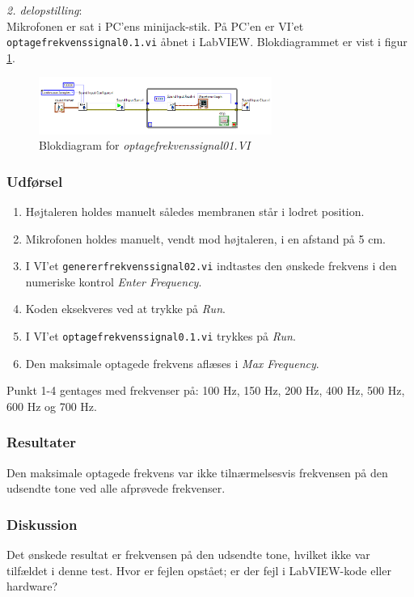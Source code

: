 		\textit{2. delopstilling}:\\
		Mikrofonen er sat i PC'ens minijack-stik. På PC'en er VI'et \texttt{optagefrekvenssignal0.1.vi} åbnet i LabVIEW. Blokdiagrammet er vist i figur \ref{fig:1of01}.\\
		
		\begin{figure}[htb]
			\centering
				\includegraphics[width=3in]{of01}
				\caption{Blokdiagram for \textit{optagefrekvenssignal01.VI}}	
				\label{fig:1of01}
			\end{figure}
		
		\subsubsection{Udførsel}
			\begin{enumerate}
				\item Højtaleren holdes manuelt således membranen står i lodret position. 
				\item Mikrofonen holdes manuelt, vendt mod højtaleren, i en afstand på 5 cm. 
				\item I VI'et \texttt{genererfrekvenssignal02.vi} indtastes den ønskede frekvens i den numeriske kontrol \textit{Enter Frequency}. 
				
						\item Koden eksekveres ved at trykke på \textit{Run}. 
					
				\item I VI'et \texttt{optagefrekvenssignal0.1.vi} trykkes på \textit{Run}. 
					
						\item Den maksimale optagede frekvens aflæses i \textit{Max Frequency}.   
			\end{enumerate}
			
			Punkt 1-4 gentages med frekvenser på: 100 Hz, 150 Hz, 200 Hz, 400 Hz, 500 Hz, 600 Hz og 700 Hz. 
			
			\subsubsection{Resultater}
			Den maksimale optagede frekvens var ikke tilnærmelsesvis frekvensen på den udsendte tone ved alle afprøvede frekvenser. 
			\subsubsection{Diskussion}
			Det ønskede resultat er frekvensen på den udsendte tone, hvilket ikke var tilfældet i denne test. Hvor er fejlen opstået; er der fejl i LabVIEW-kode eller hardware? 
